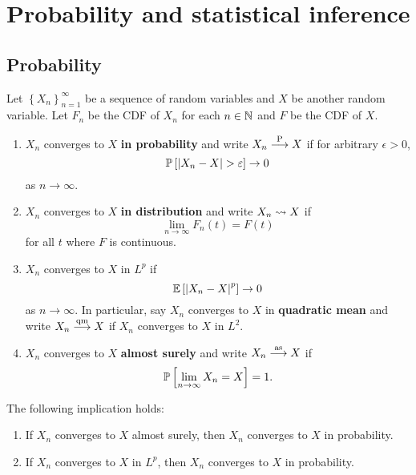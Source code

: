 \documentclass[a4paper]{article}
\begin{document}
\maketitle

\tableofcontents

\section{Probability and statistical inference}

\subsection{Probability}
\begin{defi}
Let $\left\{ X_n \right\}_{n=1}^\infty$ be a sequence of random
variables and $X$ be another random variable. Let 
$F_n$ be the CDF of $X_n$ for each $n \in \mathbb{N}$ and $F$ 
be the CDF of $X$. 
\begin{enumerate}
  \item $X_n$ converges to $X$ \textbf{in probability} 
  and write $X_n \overset{\mathrm{P}}{\longrightarrow} X$ if for arbitrary 
  $\epsilon > 0$, 
  \[
  \mathbb{P} \left[ \left\lvert X_n - X\right\rvert > \varepsilon \right] \to 0
  \]
  as $n \to \infty$.

  \item $X_n$ converges to $X$ \textbf{in distribution} and 
  write $X_n \rightsquigarrow X$ if 
  \[
  \lim_{n \to \infty} F_n(t) = F(t)
  \]
  for all $t$ where $F$ is continuous.
  
  \item $X_n$ converges to $X$ in $L^p$ if 
  \[
  \mathbb{E} \left[ \left\lvert X_n - X\right\rvert^p \right] \to 0
  \]
  as $n \to \infty$. In particular, say $X_n$ converges to 
  $X$ in \textbf{quadratic mean} and write $X_n \overset{\mathrm{qm}}{\longrightarrow} X$
  if $X_n$ converges to $X$ in $L^2$.

  \item $X_n$ converges to $X$ \textbf{almost surely} 
  and write $X_n \overset{\mathrm{as}}{\longrightarrow} X$ if 
  \[
  \mathbb{P} \left[ \lim_{n \to \infty} X_n =  X \right] = 1. 
  \]
\end{enumerate}
\end{defi}

\begin{thm}
The following implication holds:
\begin{enumerate}
  \item If $X_n$ converges to $X$ almost surely, 
  then $X_n$ converges to $X$ in probability. 
  
  \item If $X_n$ converges to $X$ in $L^p$, then 
  $X_n$ converges to $X$ in probability.
\end{enumerate}
\end{thm}
\end{document}
